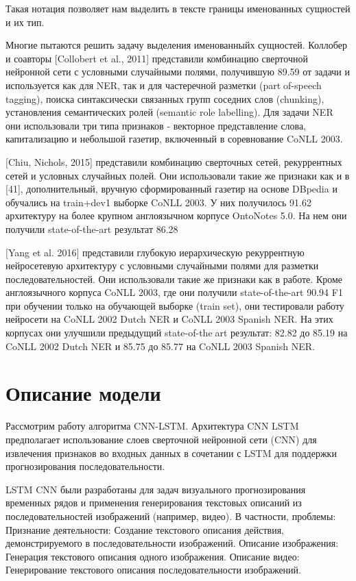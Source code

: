 \documentclass{article}
\begin{document}
Такая нотация позволяет нам выделить в тексте границы именованных сущностей и их тип.

Многие пытаются решить задачу выделения именованныйх сущностей. 
Коллобер и соавторы [Collobert et al., 2011] представили комбинацию
сверточной нейронной сети с условными случайными полями, получившую
89.59%
от задачи и используется как для NER, так и для частеречной разметки (partof-speech tagging), поиска синтаксически связанных групп соседних слов
(chunking), установления семантических ролей (semantic role labelling). Для
задачи NER они использовали три типа признаков - векторное представление
слова, капитализацию и небольшой газетир, включенный в соревнование
CoNLL 2003. 

[Chiu, Nichols, 2015] представили комбинацию сверточных сетей, 
рекуррентных сетей и условных случайных полей. Они использовали такие
же признаки как и в [41], дополнительный, вручную сформированный
газетир на основе DBpedia и обучались на train+dev1 выборке CoNLL 2003. У
них получилось 91.62%
архитектуру на более крупном англоязычном корпусе OntoNotes 5.0. На нем
они получили state-of-the-art результат 86.28%


[Yang et al. 2016] представили глубокую иерархическую
рекуррентную нейросетевую архитектуру с условными случайными полями
для разметки последовательностей. Они использовали такие же признаки как
в работе. Кроме англоязычного корпуса CoNLL 2003, где они получили
state-of-the-art 90.94 F1 при обучении только на обучающей выборке (train 
set), они тестировали работу нейросети на CoNLL 2002 Dutch NER и CoNLL 
2003 Spanish NER. На этих корпусах они улучшили предыдущий state-of-theart результат: 82.82 до 85.19 на CoNLL 2002 Dutch NER и 85.75 до
85.77 на CoNLL 2003 Spanish NER.


\section{Описание модели}




Рассмотрим работу алгоритма CNN-LSTM. Архитектура CNN LSTM предполагает использование слоев сверточной нейронной сети (CNN) для извлечения признаков во входных данных в сочетании с LSTM для поддержки прогнозирования последовательности.

LSTM CNN были разработаны для задач визуального прогнозирования временных рядов и применения генерирования текстовых описаний из последовательностей изображений (например, видео). В частности, проблемы:
Признание деятельности: Создание текстового описания действия, демонстрируемого в последовательности изображений.
Описание изображения: Генерация текстового описания одного изображения.
Описание видео: Генерирование текстового описания последовательности изображений.
\end{document}
